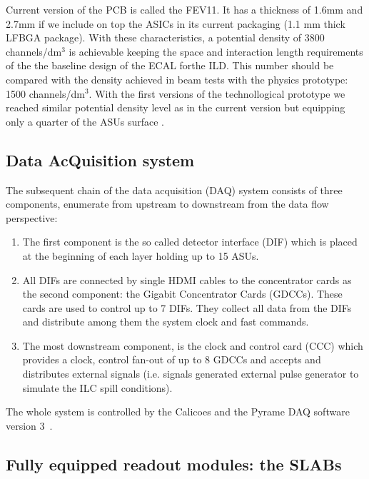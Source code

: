 \documentclass[a4paper,11pt]{article}
\begin{document}
Current version of the PCB is called the FEV11. It has a thickness of 1.6mm and 2.7mm
if we include on top the ASICs in its current packaging (1.1 mm thick LFBGA package).
With these characteristics, a potential density of
3800 channels/dm$^{3}$ is achievable keeping the space and
interaction length requirements of the the baseline design of the ECAL forthe ILD.
This number should be compared with
the density achieved in beam tests with the physics prototype: 1500 channels/dm$^{3}$.
With the first versions
of the technollogical prototype we reached similar potential density level as in
the current version but equipping only a
quarter of the ASUs surface \cite{Amjad:2014tha}.

\subsection{Data AcQuisition system}
\label{sec:DAQ}

The subsequent chain of the data acquisition (DAQ)\cite{Gastaldi:2014vaa} system consists of three components, enumerate from upstream to downstream from the data flow perspective:

\begin{enumerate}
\item The first component is the so called detector interface (DIF) which is placed at the beginning of each layer holding up to 15 ASUs.
\item All DIFs are connected by single HDMI cables to the concentrator cards as the second component: the Gigabit Concentrator Cards (GDCCs). These cards are used to control up to 7 DIFs. They collect all data from the DIFs and distribute among them the system clock and fast commands.
  \item The most downstream component, is the clock and control card (CCC) which
provides a clock, control fan-out of up to 8 GDCCs and accepts and distributes external signals (i.e. signals
generated external pulse generator to simulate the ILC spill conditions).
\end{enumerate}

The whole system is controlled by the Calicoes and the Pyrame DAQ software version 3~\cite{Rubio-Roy:2017ere,Magniette:2018wdz}.

\subsection{Fully equipped readout modules: the SLABs}
\label{sec:setup}
\end{document}
